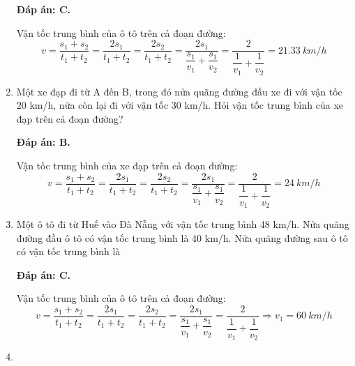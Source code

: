 \begin{enumerate}[label=\bfseries Câu \arabic*:]
	\hideall
	{\textbf{Đáp án: C.}	
		
		Vận tốc trung bình của ô tô trên cả đoạn đường:
		$$v=\dfrac{s_1+s_2}{t_1+t_2} = \dfrac{2s_1}{t_1+t_2} = \dfrac{2s_2}{t_1+t_2} = \dfrac{2s_1}{\dfrac{s_1}{v_1}+\dfrac{s_1}{v_2}} = \dfrac{2}{\dfrac{1}{v_1}+\dfrac{1}{v_2}} = \SI{21.33}{km/h}$$
		
	}
	\item {}
	
	
	{Một xe đạp đi từ A đến B, trong đó nửa quãng đường đầu xe đi với vận tốc 20 km/h, nửa còn lại đi với vận tốc 30 km/h. Hỏi vận tốc trung bình của xe đạp trên cả đoạn đường?
		
		
	}
	
	\hideall
	{\textbf{Đáp án: B.}
		
		Vận tốc trung bình của xe đạp trên cả đoạn đường:
		$$v=\dfrac{s_1+s_2}{t_1+t_2} = \dfrac{2s_1}{t_1+t_2} = \dfrac{2s_2}{t_1+t_2} = \dfrac{2s_1}{\dfrac{s_1}{v_1}+\dfrac{s_1}{v_2}} = \dfrac{2}{\dfrac{1}{v_1}+\dfrac{1}{v_2}} = \SI{24}{km/h}$$
		
	}
	\item {}
	
	
	{Một ô tô đi từ Huế vào Đà Nẵng với vận tốc trung bình 48 km/h. Nửa quãng đường đầu ô tô có vận tốc trung bình là 40 km/h. Nửa quãng đường sau ô tô có vận tốc trung bình là
		
		
	}
	
	\hideall
	{\textbf{Đáp án: C.}
		
		Vận tốc trung bình của ô tô trên cả đoạn đường:
		$$v=\dfrac{s_1+s_2}{t_1+t_2} = \dfrac{2s_1}{t_1+t_2} = \dfrac{2s_2}{t_1+t_2} = \dfrac{2s_1}{\dfrac{s_1}{v_1}+\dfrac{s_1}{v_2}} = \dfrac{2}{\dfrac{1}{v_1}+\dfrac{1}{v_2}} \Rightarrow v_1 = \SI{60}{km/h}$$
	}
	\item {}
	

\end{enumerate}
